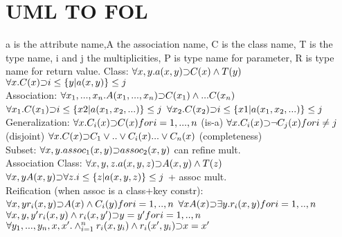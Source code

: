 \documentclass{article}
\DeclareRobustCommand{\impl}{\text{\reflectbox{$\subset$}}}
\begin{document}
\section{UML TO FOL}
a is the attribute name,A the association name, C is the class name, T is the type name, i and j the multiplicities, P is type name for parameter, R is type name for return value.
Class: 
\newline 
$\forall x,y. a(x,y) \impl C(x) \wedge T(y)$ \newline 
$\forall x. C(x) \impl i\leq\{y|a(x,y)\}\leq j $\\

Association: 
\newline $\forall x_1,...,x_n . A(x_1,...,x_n) \impl C(x_1) \wedge ... C(x_n)$ \newline 
$\forall x_1. C(x_1) \impl i\leq\{x2|a(x_1,x_2,...)\}\leq j $\newline
$\forall x_2. C(x_2) \impl i\leq\{x1|a(x_1,x_2,...)\}\leq j $ \\

Generalization: 
\newline $\forall x. C_i(x) \impl C(x) for i=1,...,n $ (is-a) \newline 
$\forall x. C_i(x) \impl \neg C_j(x) for i\not=j $ (disjoint)\newline
$\forall x. C(x) \impl C_1 \vee.. \vee C_i(x)...\vee C_n(x)  $ (completeness) \\

Subset:\newline
$\forall x,y . assoc_1(x,y)\impl assoc_2(x,y)$ can refine mult. \\

Association Class: \newline
$\forall x,y,z. a(x,y,z) \impl A(x,y)\wedge T(z)$\newline
$\forall x,y  A(x,y) \impl \forall z. i \leq \{z|a(x,y,z)\}\leq j$ + assoc mult.\\

Reification (when assoc is a class+key constr):\newline
$\forall x,y r_i(x,y) \impl A(x) \wedge C_i(y) for i=1,..,n$\newline
$\forall x  A(x) \impl \exists y. r_i(x,y) for i=1,..,n$\newline
$\forall x,y,y'  r_i(x,y) \wedge r_i(x,y') \impl y=y' for i=1,..,n$\newline
$\forall y_1,...,y_n,x,x'. \wedge_{i=1}^{n} r_i(x,y_i)\wedge r_i(x',y_i)  \impl x=x'$\\
\end{document}
